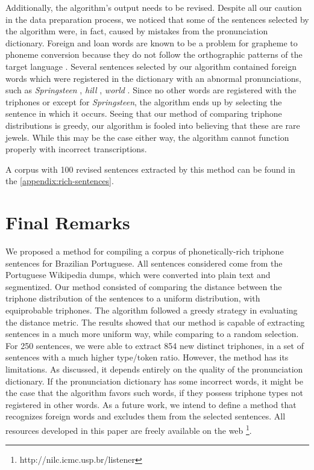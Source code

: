 Additionally, the algorithm's output needs to be revised. Despite all our caution in the data preparation process, we noticed
that some of the sentences selected by the algorithm were, in fact, caused by mistakes from the pronunciation dictionary.
Foreign and loan words are known to be a problem for grapheme to 
phoneme conversion because they do not follow the orthographic patterns of the target language \cite{Steigner2007}. Several 
sentences selected by our algorithm contained foreign words which were registered in the dictionary with an abnormal pronunciations, such
as \emph{Springsteen} , \emph{hill} \textipa{[iww]}, \emph{world} \textipa{[wohwdZ]}. Since no other words are registered with the triphones \textipa{[e-e+\~e]} or \textipa{[e-\~e]} except for 
\emph{Springsteen}, the algorithm ends up by selecting the sentence in which it occurs. Seeing that our method 
of comparing triphone distributions is greedy, our algorithm is fooled into believing that these are rare jewels. 
While this may be the case either way, the algorithm cannot function properly with incorrect transcriptions. 

A corpus with 100 revised sentences extracted by this method can be found in the \autoref{appendix:rich-sentences}.

\section{Final Remarks}

We proposed a method for compiling a corpus of phonetically-rich triphone sentences for Brazilian Portuguese.
All sentences considered come from the Portuguese Wikipedia dumps, which were converted into plain
text and segmentized. Our method consisted of comparing the distance between the triphone distribution
of the sentences to a uniform distribution, with equiprobable triphones. The algorithm followed
a greedy strategy in evaluating the distance metric. The results showed that our method is capable 
of extracting sentences in a much more uniform way, while comparing to a random selection. 
For 250 sentences, we were able to extract 854 new distinct triphones, in a set of sentences
with a much higher type/token ratio. However, the method has its limitations. As discussed,
it depends entirely on the quality of the pronunciation dictionary. If the pronunciation dictionary
has some incorrect words, it might be the case that the algorithm favors such words, if they possess
triphone types not registered in other words. As a future work, we intend to define a method that recognizes foreign words and excludes them from the selected sentences. All resources developed in this paper are freely available on the web \footnote{http://nilc.icmc.usp.br/listener}.

